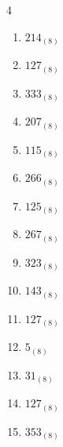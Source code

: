 \begin{multicols}{4}
\begin{enumerate}
        \phantom{$=16$}

  \item $214_{(8)}$

        \phantom{$=140$}

\columnbreak %

\resetques

  \item $127_{(8)}$

        \phantom{$=87$}

  \item $333_{(8)}$

        \phantom{$=219$}

  \item $207_{(8)}$

        \phantom{$=135$}

  \item $115_{(8)}$

        \phantom{$=77$}

  \item $266_{(8)}$

        \phantom{$=182$}

  \item $125_{(8)}$

        \phantom{$=85$}

  \item $267_{(8)}$

        \phantom{$=183$}

  \item $323_{(8)}$

        \phantom{$=211$}

  \item $143_{(8)}$

        \phantom{$=99$}

  \item $127_{(8)}$

        \phantom{$=87$}

  \item $5_{(8)}$

        \phantom{$=5$}

  \item $31_{(8)}$

        \phantom{$=25$}

  \item $127_{(8)}$

        \phantom{$=87$}

  \item $353_{(8)}$


\end{enumerate}
\end{multicols}
